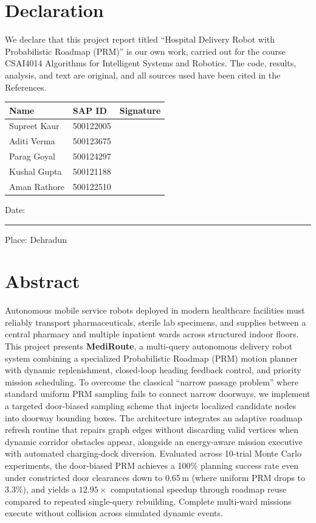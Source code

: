 \documentclass[12pt,a4paper]{article}
\begin{document}
\section*{Declaration}
We declare that this project report titled ``Hospital Delivery Robot with Probabilistic Roadmap (PRM)'' is our own work, carried out for the course CSAI4014 Algorithms for Intelligent Systems and Robotics. The code, results, analysis, and text are original, and all sources used have been cited in the References.

\vspace{0.6cm}
\begin{center}
\renewcommand{\arraystretch}{1.8}
\begin{tabular}{|P{5.0cm}|P{3.0cm}|P{4.5cm}|}
\hline
\textbf{Name} & \textbf{SAP ID} & \textbf{Signature} \\ \hline
Supreet Kaur & 500122005 & \\ \hline
Aditi Verma & 500123675 & \\ \hline
Parag Goyal & 500124297 & \\ \hline
Kushal Gupta & 500121188 & \\ \hline
Aman Rathore & 500122510 & \\ \hline
\end{tabular}
\end{center}

\vspace{0.6cm}
Date: \rule{4cm}{0.4pt} \hfill Place: Dehradun
\newpage

\section*{Abstract}
Autonomous mobile service robots deployed in modern healthcare facilities must reliably transport pharmaceuticals, sterile lab specimens, and supplies between a central pharmacy and multiple inpatient wards across structured indoor floors. This project presents \textbf{MediRoute}, a multi-query autonomous delivery robot system combining a specialized Probabilistic Roadmap (PRM) motion planner with dynamic replenishment, closed-loop heading feedback control, and priority mission scheduling. To overcome the classical ``narrow passage problem'' where standard uniform PRM sampling fails to connect narrow doorways, we implement a targeted door-biased sampling scheme that injects localized candidate nodes into doorway bounding boxes. The architecture integrates an adaptive roadmap refresh routine that repairs graph edges without discarding valid vertices when dynamic corridor obstacles appear, alongside an energy-aware mission executive with automated charging-dock diversion. Evaluated across 10-trial Monte Carlo experiments, the door-biased PRM achieves a 100\% planning success rate even under constricted door clearances down to 0.65\,m (where uniform PRM drops to 3.3\%), and yields a $12.95\times$ computational speedup through roadmap reuse compared to repeated single-query rebuilding. Complete multi-ward missions execute without collision across simulated dynamic events.
\end{document}
